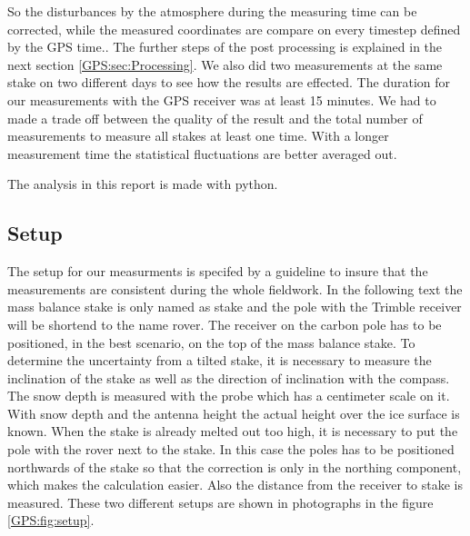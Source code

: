 So the disturbances by the atmosphere during the measuring time can be corrected, while the measured coordinates are compare on every timestep defined by the GPS time.. 
The further steps of the post processing is explained in the next section \ref{GPS:sec:Processing}.
We also did two measurements at the same stake on two different days to see how the results are effected.
The duration for our measurements with the GPS receiver was at least 15 minutes. 
We had to made a trade off between the quality of the result and the total number of
measurements to measure all stakes at least one time. 
With a longer measurement time the statistical fluctuations are better averaged out.
\medskip

The analysis in this report is made with python.

\subsection{Setup} \label{GPS:subsec:setup}


The setup for our measurments is specifed by a guideline to insure that the measurements are consistent during the whole fieldwork.
In the following text the mass balance stake is only named as stake and the pole with the Trimble receiver will be shortend to the name rover.
The receiver on the carbon pole has to be positioned, in the best scenario, on the top of the mass balance stake.
To determine the uncertainty from a tilted stake, it is necessary to measure the inclination of the stake as well as the direction of inclination with the compass.
The snow depth is measured with the probe which has a centimeter scale on it.
With snow depth and the antenna height the actual height over the ice surface is known. 
When the stake is already melted out too high, it is necessary to put the pole with the rover next to the stake. 
In this case the poles has to be positioned northwards of the stake so that the correction is only in the northing component, which makes the calculation easier. 
Also the distance from the receiver to stake is measured.
These two different setups are shown in photographs in the figure \ref{GPS:fig:setup}.

